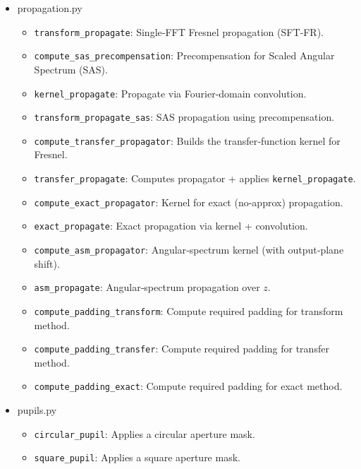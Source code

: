 \documentclass[a4paper,12pt]{report}
\begin{document}
\begin{itemize}[itemsep=1em]
  \item[\large\bfseries 6.\ ] propagation.py
    \begin{itemize}[itemsep=0.5em]
      \item \texttt{transform\_propagate}: Single‑FFT Fresnel propagation (SFT‑FR).
      \item \texttt{compute\_sas\_precompensation}: Precompensation for Scaled Angular Spectrum (SAS).
      \item \texttt{kernel\_propagate}: Propagate via Fourier‐domain convolution.
      \item \texttt{transform\_propagate\_sas}: SAS propagation using precompensation.
      \item \texttt{compute\_transfer\_propagator}: Builds the transfer‐function kernel for Fresnel.
      \item \texttt{transfer\_propagate}: Computes propagator + applies \texttt{kernel\_propagate}.
      \item \texttt{compute\_exact\_propagator}: Kernel for exact (no‑approx) propagation.
      \item \texttt{exact\_propagate}: Exact propagation via kernel + convolution.
      \item \texttt{compute\_asm\_propagator}: Angular‐spectrum kernel (with output‐plane shift).
      \item \texttt{asm\_propagate}: Angular‐spectrum propagation over \(z\).
      \item \texttt{compute\_padding\_transform}: Compute required padding for transform method.
      \item \texttt{compute\_padding\_transfer}: Compute required padding for transfer method.
      \item \texttt{compute\_padding\_exact}: Compute required padding for exact method.
    \end{itemize}

  \item[\large\bfseries 7.\ ] pupils.py
    \begin{itemize}[itemsep=0.5em]
      \item \texttt{circular\_pupil}: Applies a circular aperture mask.
      \item \texttt{square\_pupil}: Applies a square aperture mask.
    \end{itemize}


\end{itemize}
\end{document}
